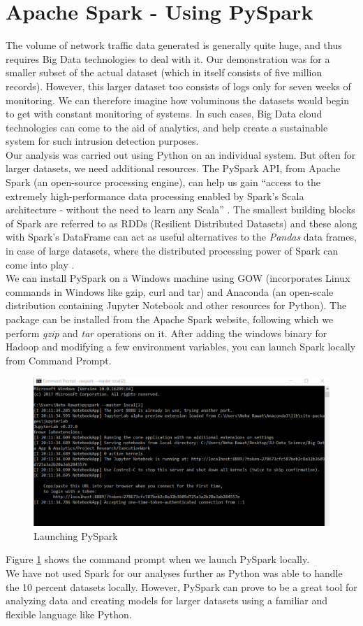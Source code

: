 \section{Apache Spark - Using PySpark}
The volume of network traffic data generated is generally quite huge, and thus requires Big Data technologies to deal with it. Our demonstration was for a smaller subset of the actual dataset (which in itself consists of five million records). However, this larger dataset too consists of logs only for seven weeks of monitoring. We can therefore imagine how voluminous the datasets would begin to get with constant monitoring of systems. In such cases, Big Data cloud technologies can come to the aid of analytics, and help create a sustainable system for such intrusion detection purposes.\\
Our analysis was carried out using Python on an individual system. But often for larger datasets, we need additional resources. The PySpark API, from Apache Spark (an open-source processing engine), can help us  gain ``access to the extremely high-performance data processing enabled by Spark's Scala architecture - without the need to learn any Scala'' \cite{pysp11}. The smallest building blocks of Spark are referred to as RDDs (Resilient Distributed Datasets) and these along with Spark's DataFrame can act as useful alternatives to the {\em Pandas} data frames, in case of large datasets, where the distributed processing power of Spark can come into play \cite{pysp11}.\\
We can install PySpark on a Windows machine using GOW (incorporates Linux commands in Windows like gzip, curl and tar) and Anaconda (an open-scale distribution containing Jupyter Notebook and other resources for Python). The package can be installed from the Apache Spark website, following which we perform {\em gzip} and {\em tar} operations on it. After adding the windows binary for Hadoop and modifying a few environment variables, you can launch Spark locally from Command Prompt. 
\begin{figure}
	\includegraphics[width=1.0\columnwidth]{images/pyspark.PNG}
	\caption{Launching PySpark}
	\label{F:ps}
\end{figure}
Figure \ref{F:ps} shows the command prompt when we launch PySpark locally.\\
We have not used Spark for our analyses further as Python was able to handle the 10 percent datasets locally. However, PySpark can prove to be a great tool for analyzing data and creating models for larger datasets using a familiar and flexible language like Python.

